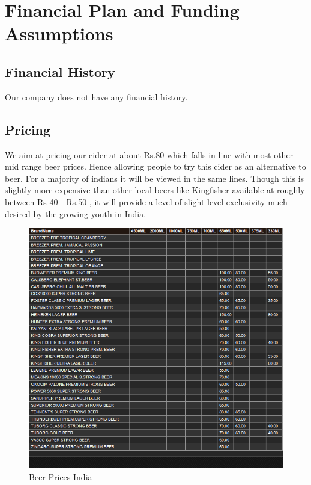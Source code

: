 \documentclass[11pt]{article}
\begin{document}
\newpage


\section{Financial Plan and Funding Assumptions}
  \subsection{Financial History}
Our company does not have any financial history.

	\subsection{Pricing}
We aim at pricing our cider at about Rs.80 which falls in line with most other
mid range beer prices. Hence allowing people to try this cider as an alternative 
to beer. For a majority of indians it  will be viewed in the same lines. Though 
this is slightly more expensive than other local beers like Kingfisher available
at roughly between Rs 40 - Rs.50 , it will provide a level of slight level 
exclusivity much desired by the growing youth in India.

	\begin{figure}[h!]
	\caption{Beer Prices India}
	\centering
	\includegraphics[width=\textwidth]{beerprices.png}
	\end{figure}
\end{document}
